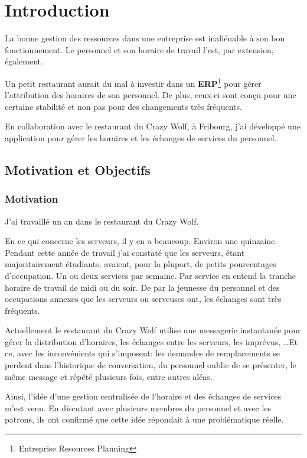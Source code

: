 \chapter[Introduction]{Introduction}

La bonne gestion des ressources dans une entreprise est inaliénable à son bon fonctionnement. Le personnel et son horaire de travail l'est, par extension, également. 

Un petit restaurant aurait du mal à investir dans un \textbf{ERP}\footnote{Entreprise Resources Planning} pour gérer l'attribution des horaires de son personnel. De plus, ceux-ci sont conçu pour une certaine stabilité et non pas pour des changements très fréquents.

En collaboration avec le restaurant du Crazy Wolf, à Fribourg, j'ai développé une application pour gérer les horaires et les échanges de services du personnel.

\section[Motivations et objectifs]{Motivation et Objectifs}

\subsection*{Motivation}
J'ai travaillé un an dans le restaurant du Crazy Wolf.

En ce qui concerne les serveurs, il y en a beaucoup. Environ une quinzaine. Pendant cette année de travail j'ai constaté que les serveurs, étant majoritairement étudiants, avaient, pour la plupart, de petits pourcentages d'occupation. Un ou deux services par semaine. Par service en entend la tranche horaire de travail de midi ou du soir. 
De par la jeunesse du personnel et des occupations annexes que les serveurs ou serveuses ont, les échanges sont très fréquents. 

Actuellement le restaurant du Crazy Wolf utilise une messagerie instantanée pour gérer la distribution d'horaires, les échanges entre les serveurs, les imprévus, \dots Et ce, avec les inconvénients qui s'imposent: les demandes de remplacements se perdent dans l'historique de conversation, du personnel oublie de se présenter, le même message et répété plusieurs fois, entre autres aléas.

Ainsi, l'idée d'une gestion centralisée de l'horaire et des échanges de services m'est venu. En discutant avec plusieurs membres du personnel et avec les patrons, ils ont confirmé que cette idée répondait à une problématique réelle. 


